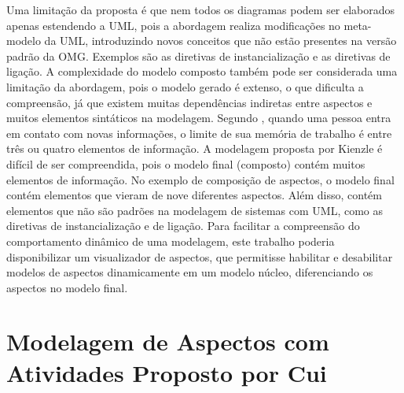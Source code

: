 Uma limitação da proposta é que nem todos os diagramas podem ser elaborados apenas estendendo a UML, pois a abordagem realiza modificações no
meta-modelo da UML, introduzindo novos conceitos que não estão presentes na versão padrão da OMG. Exemplos são as diretivas de instancialização e as diretivas de ligação. 
A complexidade do modelo composto também pode ser considerada uma limitação da abordagem, pois o modelo gerado é extenso, o que dificulta a
compreensão, já que existem muitas dependências indiretas entre aspectos e muitos elementos sintáticos na modelagem. Segundo \cite{seventwo:11},
quando uma pessoa entra em contato com novas informações, o limite de sua memória de trabalho é entre três ou quatro elementos de informação. A
modelagem proposta por Kienzle é difícil de ser compreendida, pois o modelo final (composto) contém muitos
elementos de informação. No exemplo de composição de aspectos, o modelo final contém elementos que vieram de nove diferentes aspectos. Além disso, contém elementos
que não são padrões na modelagem de sistemas com UML, como as diretivas de instancialização e de ligação. Para facilitar a compreensão do
comportamento dinâmico de uma modelagem, este trabalho poderia disponibilizar um visualizador de aspectos, que permitisse habilitar e desabilitar
modelos de aspectos dinamicamente em um modelo núcleo, diferenciando os aspectos no modelo final.

\section{Modelagem de Aspectos com Atividades Proposto por Cui}


